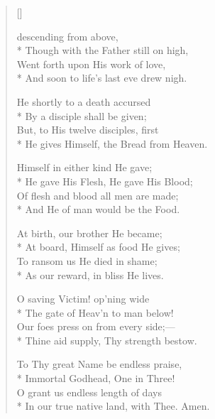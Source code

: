 \begin{verse}[\versewidth]

 descending from above,\\*
Though with the Father still on high,\\
Went forth upon His work of love,      \\* 
And soon to life's last eve drew nigh.
\pointorig

He shortly to a death accursed  \\*
By a disciple shall be given; \\
But, to His twelve disciples, first     \\*
He gives Himself, the Bread from Heaven.     

Himself in either kind He gave;\\*
He gave His Flesh, He gave His Blood;   \\
Of flesh and blood all men are made;    \\*
And He of man would be the Food.       

At birth, our brother He became;   \\*
At board, Himself as food He gives;  \\
To ransom us He died in shame;\\*
As our reward, in bliss He lives.      


O saving Victim! op'ning wide  \\*
The gate of Heav'n to man below!    \\
Our foes press on from every side;---  \\*
Thine aid supply, Thy strength         
  bestow.                              

To Thy great Name be endless           
  praise,          \\*
Immortal Godhead, One in Three!        \\
O grant us endless length of days      \\*
In our true native land, with Thee.    
Amen.                     

\end{verse}


